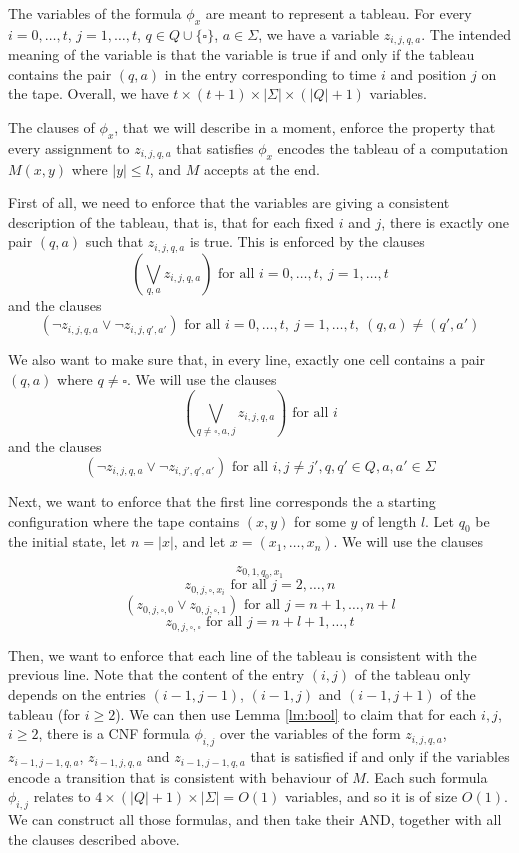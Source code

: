 The variables of the formula $\phi_x$ are meant
to represent a tableau. For every $i=0,\ldots,t$,
$j=1,\ldots,t$, $q\in Q \cup \{ \square \}$,  $a\in \Sigma$,
we have a variable $z_{i,j,q,a}$. The intended
meaning of the variable is that the variable is true
if and only if the tableau contains the pair $(q,a)$
in the entry corresponding to time $i$ and position $j$
on the tape. Overall, we have $t\times(t+1)\times |\Sigma|
\times(|Q|+1)$ variables.

The clauses of $\phi_x$, that we will describe in a moment,
enforce the property that every assignment to $z_{i,j,q,a}$
that satisfies $\phi_x$ encodes the tableau of a computation
$M(x,y)$ where $|y| \leq l$, and $M$ accepts at the end.

First of all, we need to enforce that the variables
are giving a consistent description of the tableau,
that is, that for each fixed $i$ and $j$, there is
exactly one pair $(q,a)$ such that $z_{i,j,q,a}$ is true.
This is enforced by the clauses
\[ (\bigvee_{q,a} z_{i,j,q,a}) \mbox{ for all } i=0,\ldots,t, \ j = 1,\ldots,t
 \]
and the clauses
\[ (\neg z_{i,j,q,a} \vee \neg z_{i,j,q',a'}) \mbox{ for all }
i=0,\ldots,t,\ j=1,\ldots,t, \ (q,a) \neq (q',a')\]

We also want to make sure that, in every line, exactly one
cell contains a pair $(q,a)$ where $q\neq \square$. We will
use the clauses
\[ (\bigvee_{q\neq \square,a,j} z_{i,j,q,a}) \mbox{ for all } i \]
and the clauses
\[ (\neg z_{i,j,q,a} \vee \neg z_{i,j',q',a'}) \mbox{ for all }
i, j\neq j', q,q' \in Q, a,a'\in \Sigma\]



Next, we want to enforce that the first line corresponds the
a starting configuration where the tape
contains $(x,y)$ for some $y$ of length $l$. Let $q_0$
be the initial state, let $n=|x|$, and let 
$x = (x_1,\ldots,x_n)$. We will use the clauses

\[ z_{0,1,q_0,x_1} \]
\[ z_{0,j,\square,x_i} \mbox{ for all }j=2,\ldots,n \]
\[ (z_{0,j,\square,0} \vee z_{0,j,\square,1}) \mbox{ for all } 
j=n+1,\ldots,n+l
 \]
\[ z_{0,j,\square,\square} \mbox{ for all } j=n+l+1,\ldots,t \]

Then, we want to enforce that each line of the tableau is consistent
with the previous line. Note that the content of the entry $(i,j)$
of the tableau only depends on the entries $(i-1,j-1)$, $(i-1,j)$
and $(i-1,j+1)$ of the tableau (for $i\geq 2$). We can then
use Lemma \ref{lm:bool} to claim that
for each $i,j$, $i\geq 2$, there is a CNF formula $\phi_{i,j}$
over the variables of the form $z_{i,j,q,a}$, $z_{i-1,j-1,q,a}$,
$z_{i-1,j,q,a}$ and $z_{i-1,j-1,q,a}$ that is satisfied if and
only if the variables encode a transition that is consistent
with behaviour of $M$. Each such formula $\phi_{i,j}$ relates
to $4\times (|Q|+1)\times |\Sigma| = O(1)$ variables,
and so it is of size $O(1)$. We can construct all those
formulas, and then take their AND, together with all the clauses
described above.

